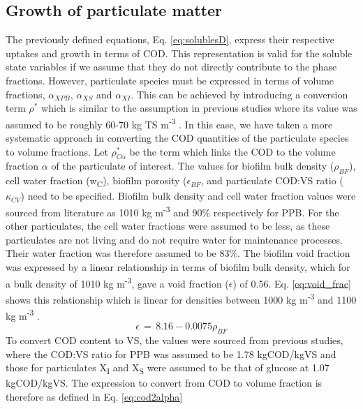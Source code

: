 \subsection{Growth of particulate matter}
The previously defined equations, Eq. \eqref{eq:solublesD}, express their respective uptakes and growth in terms of COD. 
This representation is valid for the soluble state variables if we assume that they do not directly contribute to the phase fractions. 
However, particulate species must be expressed in terms of volume fractions, $\alpha_{XPB}$, $\alpha_{XS}$ and $\alpha_{XI}$. 
This can be achieved by introducing a conversion term $\rho^*$ which is similar to the assumption in previous studies where its value was assumed to be roughly 60-70 kg TS m\textsuperscript{-3} \cite{alpkvist2007,polizzi2017}. 
In this case, we have taken a more systematic approach in converting the COD quantities of the particulate species to volume fractions. 
Let $\rho^*_{C\alpha}$ be the term which links the COD to the volume fraction $\alpha$ of the particulate of interest. The values for biofilm bulk density ($\rho_{BF}$), cell water fraction (w\textsubscript{C}), biofilm porosity ($\epsilon_{BF}$, and particulate COD:VS ratio ($\kappa_{CV}$) need to be specified. Biofilm bulk density and cell water fraction values were sourced from literature \cite{zhangBishop1994} as 1010 kg m\textsuperscript{-3} and 90\% respectively for PPB. For the other particulates, the cell water fractions were assumed to be less, as these particulates are not living and do not require water for maintenance processes. Their water fraction was therefore assumed to be 83\%. The biofilm void fraction was expressed by a linear relationship in terms of biofilm bulk density, which for a bulk density of 1010 kg m\textsuperscript{-3}, gave a void fraction ($\epsilon$) of 0.56. Eq. \eqref{eq:void_frac} shows this relationship which is linear for densities between 1000 kg m\textsuperscript{-3} and 1100 kg m\textsuperscript{-3} \cite{humeng2013}. 
\begin{equation}
    \label{eq:void_frac}
    \epsilon \, = \, 8.16 - \num{0.0075}\rho_{BF}
\end{equation}
To convert COD content to VS, the values were sourced from previous studies, where the COD:VS ratio for PPB was assumed to be 1.78 kgCOD/kgVS \cite{puyol2017} and those for particulates X\textsubscript{I} and X\textsubscript{S} were assumed to be that of glucose at 1.07 kgCOD/kgVS. The expression to convert from COD to volume fraction is therefore as defined in Eq. \eqref{eq:cod2alpha}

